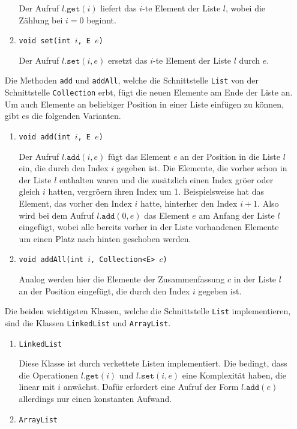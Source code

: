 \begin{enumerate}
\begin{enumerate}
            Der Aufruf $l.\mathtt{get}(i)$ liefert das $i$-te Element der Liste $l$, wobei
            die Z\"ahlung bei $i=0$ beginnt.
      \item \texttt{void set(int $i$, E $e$)}      

            Der Aufruf $l.\mathtt{set}(i, e)$ ersetzt das $i$-te Element der Liste
            $l$ durch $e$.
      \end{enumerate}
      Die Methoden \texttt{add} und \texttt{addAll}, welche die Schnittstelle \texttt{List} von
      der Schnittstelle \texttt{Collection} erbt, f\"ugt die neuen Elemente am Ende der Liste an.
      Um auch Elemente an beliebiger Position in einer Liste einf\"ugen zu k\"onnen, gibt es
      die folgenden Varianten.
      \begin{enumerate}
      \item \texttt{void add(int $i$, E $e$)}

            Der Aufruf $l.\mathtt{add}(i, e)$ f\"ugt das Element $e$
            an der Position in die Liste $l$ ein, die durch den Index $i$ gegeben ist.
            Die Elemente, die vorher schon in 
            der Liste $l$ enthalten waren und die zus\"atzlich einen Index gr\"o\3er oder
            gleich $i$ hatten, vergr\"o\3ern ihren Index um 1.  Beispielsweise hat das
            Element, das vorher den Index $i$ hatte, hinterher den Index $i+1$.
            Also wird bei dem Aufruf $l.\mathtt{add}(0,e)$ das Element $e$ am Anfang der
            Liste $l$ eingef\"ugt, wobei alle bereits vorher in der Liste vorhandenen
            Elemente um einen Platz nach hinten geschoben werden.
      \item \texttt{void addAll(int $i$, Collection<E> $c$)}

            Analog werden hier die Elemente der Zusammenfassung $c$ in
            der Liste $l$ an  der Position eingef\"ugt, die durch den Index $i$ gegeben ist.
      \end{enumerate}
      Die beiden wichtigsten Klassen, welche die Schnittstelle \texttt{List} implementieren, sind
      die Klassen \texttt{LinkedList} und \texttt{ArrayList}.
      \begin{enumerate}
      \item \texttt{LinkedList} 

            Diese Klasse ist durch verkettete Listen implementiert.  Die bedingt, dass die
            Operationen $l.\mathtt{get}(i)$ und $l.\mathtt{set}(i,e)$ eine Komplexit\"at
            haben, die linear mit $i$ anw\"achst.  Daf\"ur erfordert eine Aufruf der Form
            $l.\mathtt{add}(e)$ allerdings nur einen konstanten Aufwand.
      \item \texttt{ArrayList}


\end{enumerate}
\end{enumerate}
